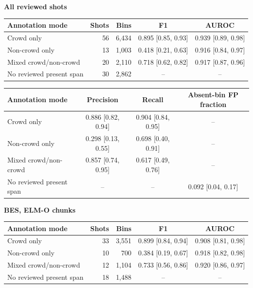 \begin{table}[t]
\centering
\small
\textbf{All reviewed shots}\par\smallskip
\begin{tabular}{lrrcc}
\toprule
Annotation mode & Shots & Bins & F1 & AUROC \\
\midrule
Crowd only & 56 & 6,434 & 0.895 {\scriptsize[0.85, 0.93]} & 0.939 {\scriptsize[0.89, 0.98]} \\
Non-crowd only & 13 & 1,003 & 0.418 {\scriptsize[0.21, 0.63]} & 0.916 {\scriptsize[0.84, 0.97]} \\
Mixed crowd/non-crowd & 20 & 2,110 & 0.718 {\scriptsize[0.62, 0.82]} & 0.917 {\scriptsize[0.87, 0.96]} \\
No reviewed present span & 30 & 2,862 & -- & -- \\
\bottomrule
\end{tabular}\par\smallskip
\begin{tabular}{lccc}
\toprule
Annotation mode & Precision & Recall & Absent-bin FP fraction \\
\midrule
Crowd only & 0.886 {\scriptsize[0.82, 0.94]} & 0.904 {\scriptsize[0.84, 0.95]} & -- \\
Non-crowd only & 0.298 {\scriptsize[0.13, 0.55]} & 0.698 {\scriptsize[0.40, 0.91]} & -- \\
Mixed crowd/non-crowd & 0.857 {\scriptsize[0.74, 0.95]} & 0.617 {\scriptsize[0.49, 0.76]} & -- \\
No reviewed present span & -- & -- & 0.092 {\scriptsize[0.04, 0.17]} \\
\bottomrule
\end{tabular}\par\medskip
\textbf{BES, ELM-O chunks}\par\smallskip
\begin{tabular}{lrrcc}
\toprule
Annotation mode & Shots & Bins & F1 & AUROC \\
\midrule
Crowd only & 33 & 3,551 & 0.899 {\scriptsize[0.84, 0.94]} & 0.908 {\scriptsize[0.81, 0.98]} \\
Non-crowd only & 10 & 700 & 0.384 {\scriptsize[0.19, 0.67]} & 0.918 {\scriptsize[0.82, 0.98]} \\
Mixed crowd/non-crowd & 12 & 1,104 & 0.733 {\scriptsize[0.56, 0.86]} & 0.920 {\scriptsize[0.86, 0.97]} \\
No reviewed present span & 18 & 1,488 & -- & -- \\
\bottomrule
\end{tabular}\par\smallskip

\end{table}
